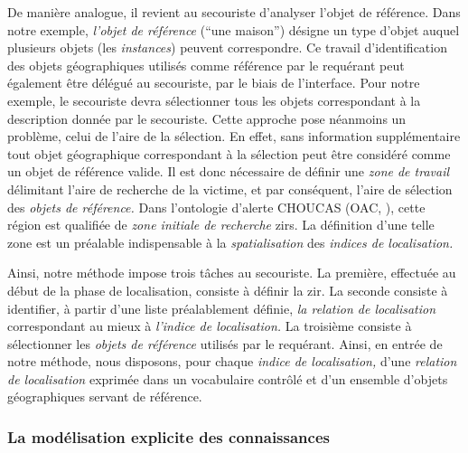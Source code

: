 De manière analogue, il revient au secouriste d'analyser l'objet de
référence. Dans notre exemple, \emph{l'objet de référence}
(\enquote{une maison}) désigne un type d'objet auquel plusieurs objets
(\ie les \emph{instances}) peuvent correspondre. Ce travail
d'identification des objets géographiques utilisés comme référence par
le requérant peut également être délégué au secouriste, par le biais
de l'interface. Pour notre exemple, le secouriste devra sélectionner
tous les objets correspondant à la description donnée par le
secouriste. Cette approche pose néanmoins un problème, celui de l'aire
de la sélection. En effet, sans information supplémentaire tout objet
géographique correspondant à la sélection peut être considéré comme un
objet de référence valide. Il est donc nécessaire de définir une
\emph{zone de travail} délimitant l'aire de recherche de la victime,
et par conséquent, l'aire de sélection des \emph{objets de référence.}
Dans l'ontologie d'alerte CHOUCAS (OAC, \cite{Viry2019}), cette région
est qualifiée de \emph{zone initiale de recherche} \acp{zir}. La
définition d'une telle zone est un préalable indispensable à la
\emph{spatialisation} des \emph{indices de localisation.}

Ainsi, notre méthode impose trois tâches au secouriste. La première,
effectuée au début de la phase de localisation, consiste à définir la
\ac{zir}. La seconde consiste à identifier, à partir d'une liste
préalablement définie, \emph{la relation de localisation}
correspondant au mieux à \emph{l'indice de localisation.} La troisième
consiste à sélectionner les \emph{objets de référence} utilisés par le
requérant.
%
Ainsi, en entrée de notre méthode, nous disposons, pour chaque
\emph{indice de localisation,} d'une \emph{relation de localisation}
exprimée dans un vocabulaire contrôlé et d'un ensemble d'objets
géographiques servant de référence.


\subsubsection{La modélisation explicite des connaissances}

